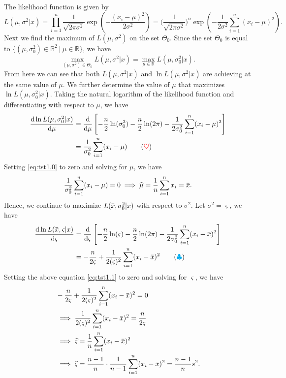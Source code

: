 The likelihood function is given by 
\[
L(\mu, \sigma^2 | x) = \prod_{i=1}^{n} \frac{1}{\sqrt{2\pi \sigma^2}} \exp\left(-\frac{(x_i - \mu)^2}{2\sigma^2}\right)
= \bigg(\frac{1}{\sqrt{2\pi \sigma^2}}\bigg)^n \exp\left(-\frac{1}{2\sigma^2} \sum_{i=1}^{n} (x_i - \mu)^2\right).
\]
Next we find the maximum of $L(\mu, \sigma^2)$ on the set $\Theta_0$. Since the set $\Theta_0$ is equal to 
$\{ (\mu, \sigma^2_0) \in \mathbb{R}^2 \> | \> \mu \in \mathbb{R} \}$, we have 
\[
    \max_{(\mu, \sigma^2) \in \Theta_0} L(\mu, \sigma^2 | x) = \max_{\mu \in \mathbb{R}} L(\mu, \sigma^2_0 | x).
\]
From here we can see that both $L(\mu, \sigma^2 | x)$ and $\ln L(\mu, \sigma^2 | x)$ are achieving at the same value of $\mu$.
We further determine the value of $\mu$ that maximizes $\ln L(\mu, \sigma^2_0 | x)$. Taking 
the natural logarithm of the likelihood function and differentiating with respect to $\mu$, we have
\begin{align*}
    \odv{\ln L(\mu, \sigma^2_0 | x)}{\mu} &= \odv[]{}{\mu} \left[ - \frac{n}{2} \ln (\sigma^2_0) - \frac{n}{2} \ln(2\pi) - \frac{1}{2\sigma^2_0} \sum^n_{i=1} (x_i - \mu)^2 \right]\\
    &= \frac{1}{\sigma^2_0} \sum_{i=1}^{n} (x_i - \mu) \label{eq:tst1.0} \tag{{\color{red} $\heartsuit$}}
\end{align*}
Setting \eqref{eq:tst1.0} to zero and solving for $\mu$, we have
\[
    \frac{1}{\sigma^2_0} \sum_{i=1}^{n} (x_i - \mu) = 0 \implies \widehat{\mu} = \frac{1}{n} \sum_{i=1}^{n} x_i = \ols{x}.
\]
Hence, we continue to maximize $L(\ols{x}, \sigma^2_0 | x)$ with respect to $\sigma^2$. Let $\sigma^2 = \varsigma$, we have
\begin{align*}
    \odv{\ln L(\ols{x}, \varsigma | x)}{\varsigma} &= \odv[]{}{\varsigma} \left[ - \frac{n}{2} \ln (\varsigma) - \frac{n}{2} \ln(2\pi) - \frac{1}{2\sigma^2_0} \sum^n_{i=1} (x_i - \ols{x})^2 \right]\\
    &= -\frac{n}{2\varsigma} + \frac{1}{2(\varsigma)^2} \sum_{i=1}^{n} (x_i - \ols{x})^2 \label{eq:tst1.1} \tag{{\color{cyan} $\clubsuit$}}
\end{align*}
Setting the above equation \eqref{eq:tst1.1} to zero and solving for $\varsigma$, we have
\begin{align*}
    &-\frac{n}{2\varsigma} + \frac{1}{2(\varsigma)^2} \sum_{i=1}^{n} (x_i - \ols{x})^2 = 0\\
    &\implies \frac{1}{2(\varsigma)^2} \sum_{i=1}^{n} (x_i - \ols{x})^2 = \frac{n}{2\varsigma}\\
    &\implies \widehat{\varsigma} = \frac{1}{n} \sum_{i=1}^{n} (x_i - \ols{x})^2 \\
    &\implies \widehat{\varsigma} = \frac{n-1}{n} \cdot \frac{1}{n-1} \sum_{i=1}^{n} (x_i - \ols{x})^2 
    = \frac{n-1}{n} s^2.
\end{align*}
